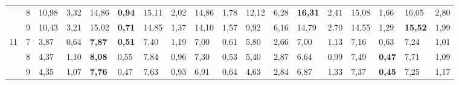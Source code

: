 \documentclass[conference]{IEEEtran}
\begin{document}
\begin{table}[]
\begin{tabular}{|cl|ll|ll|ll|ll|ll|ll|ll|ll|}
		\multicolumn{1}{|c|}{}                    & 8          & \multicolumn{1}{l|}{10,98}         & 3,32          & \multicolumn{1}{l|}{14,86}          & \textbf{0,94} & \multicolumn{1}{l|}{15,11}          & 2,02          & \multicolumn{1}{l|}{14,86}         & 1,78          & \multicolumn{1}{l|}{12,12}                & 6,28 & \multicolumn{1}{l|}{\textbf{16,31}} & 2,41 & \multicolumn{1}{l|}{15,08}          & 1,66          & \multicolumn{1}{l|}{16,05}          & 2,80 \\ \cline{2-18} 
		\multicolumn{1}{|c|}{}                    & 9          & \multicolumn{1}{l|}{10,43}         & 3,21          & \multicolumn{1}{l|}{15,02}          & \textbf{0,71} & \multicolumn{1}{l|}{14,85}          & 1,37          & \multicolumn{1}{l|}{14,10}         & 1,57          & \multicolumn{1}{l|}{9,92}                 & 6,16 & \multicolumn{1}{l|}{14,79}          & 2,70 & \multicolumn{1}{l|}{14,55}          & 1,29          & \multicolumn{1}{l|}{\textbf{15,52}} & 1,99 \\ \hline
		\multicolumn{1}{|c|}{\multirow{3}{*}{11}} & 7          & \multicolumn{1}{l|}{3,87}          & 0,64          & \multicolumn{1}{l|}{\textbf{7,87}}  & \textbf{0,51} & \multicolumn{1}{l|}{7,40}           & 1,19          & \multicolumn{1}{l|}{7,00}          & 0,61          & \multicolumn{1}{l|}{5,80}                 & 2,66 & \multicolumn{1}{l|}{7,00}           & 1,13 & \multicolumn{1}{l|}{7,16}           & 0,63          & \multicolumn{1}{l|}{7,24}           & 1,01 \\ \cline{2-18} 
		\multicolumn{1}{|c|}{}                    & 8          & \multicolumn{1}{l|}{4,37}          & 1,10          & \multicolumn{1}{l|}{\textbf{8,08}}  & 0,55          & \multicolumn{1}{l|}{7,84}           & 0,96          & \multicolumn{1}{l|}{7,30}          & 0,53          & \multicolumn{1}{l|}{5,40}                 & 2,87 & \multicolumn{1}{l|}{6,64}           & 0,99 & \multicolumn{1}{l|}{7,49}           & \textbf{0,47} & \multicolumn{1}{l|}{7,71}           & 1,09 \\ \cline{2-18} 
		\multicolumn{1}{|c|}{}                    & 9          & \multicolumn{1}{l|}{4,35}          & 1,07          & \multicolumn{1}{l|}{\textbf{7,76}}  & 0,47          & \multicolumn{1}{l|}{7,63}           & 0,93          & \multicolumn{1}{l|}{6,91}          & 0,64          & \multicolumn{1}{l|}{4,63}                 & 2,84 & \multicolumn{1}{l|}{6,87}           & 1,33 & \multicolumn{1}{l|}{7,37}           & \textbf{0,45} & \multicolumn{1}{l|}{7,25}           & 1,17 \\ \hline

\end{tabular}
\end{table}
\end{document}
